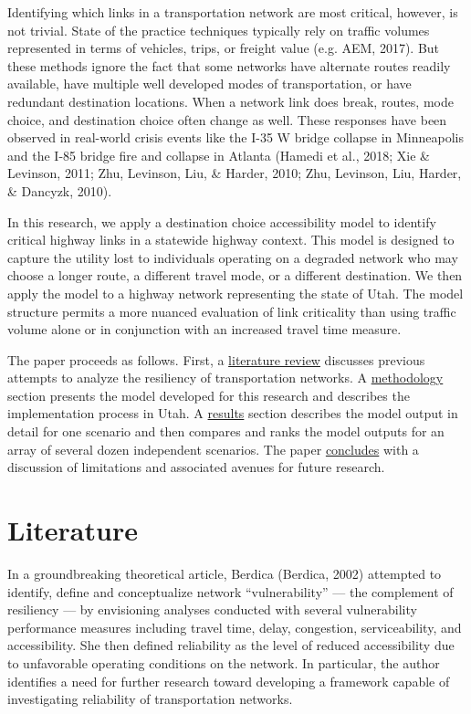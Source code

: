 \documentclass[
  letterpaper,
  number,
  review,
  3p]{elsarticle}
\begin{document}
Identifying which links in a transportation network are most critical,
however, is not trivial. State of the practice techniques typically rely
on traffic volumes represented in terms of vehicles, trips, or freight
value (e.g. AEM, 2017). But these methods ignore the fact that some
networks have alternate routes readily available, have multiple well
developed modes of transportation, or have redundant destination
locations. When a network link does break, routes, mode choice, and
destination choice often change as well. These responses have been
observed in real-world crisis events like the I-35 W bridge collapse in
Minneapolis and the I-85 bridge fire and collapse in Atlanta (Hamedi et
al., 2018; Xie \& Levinson, 2011; Zhu, Levinson, Liu, \& Harder, 2010;
Zhu, Levinson, Liu, Harder, \& Dancyzk, 2010).

In this research, we apply a destination choice accessibility model to
identify critical highway links in a statewide highway context. This
model is designed to capture the utility lost to individuals operating
on a degraded network who may choose a longer route, a different travel
mode, or a different destination. We then apply the model to a highway
network representing the state of Utah. The model structure permits a
more nuanced evaluation of link criticality than using traffic volume
alone or in conjunction with an increased travel time measure.

The paper proceeds as follows. First, a
\protect\hyperlink{litreview}{literature review} discusses previous
attempts to analyze the resiliency of transportation networks. A
\protect\hyperlink{methodology}{methodology} section presents the model
developed for this research and describes the implementation process in
Utah. A \protect\hyperlink{results}{results} section describes the model
output in detail for one scenario and then compares and ranks the model
outputs for an array of several dozen independent scenarios. The paper
\protect\hyperlink{conclusion}{concludes} with a discussion of
limitations and associated avenues for future research.


\hypertarget{litreview}{%
\section{Literature}\label{litreview}}

In a groundbreaking theoretical article, Berdica (Berdica, 2002)
attempted to identify, define and conceptualize network
``vulnerability'' --- the complement of resiliency --- by envisioning
analyses conducted with several vulnerability performance measures
including travel time, delay, congestion, serviceability, and
accessibility. She then defined reliability as the level of reduced
accessibility due to unfavorable operating conditions on the network. In
particular, the author identifies a need for further research toward
developing a framework capable of investigating reliability of
transportation networks.
\end{document}
